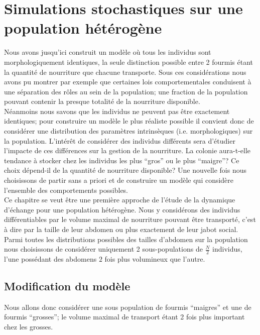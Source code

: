 
\chapter{Simulations stochastiques sur une population hétérogène}

Nous avons jusqu'ici construit un modèle où tous les individus sont morphologiquement identiques, la seule distinction possible entre 2 fourmis étant la quantité de nourriture que chacune transporte. Sous ces considérations nous avons pu montrer par exemple que certaines lois comportementales conduisent à une séparation des rôles au sein de la population; une fraction de la population pouvant contenir la presque totalité de la  nourriture disponible.\\

Néanmoins nous savons que les individus ne peuvent pas être exactement identiques; pour construire un modèle le plus réaliste possible il convient donc de considérer une distribution des paramètres intrinsèques (i.e. morphologiques) sur la population. L'intérêt de considérer des individus différents sera d'étudier l'impacte de ces différences sur la gestion de la nourriture. La colonie aura-t-elle tendance à stocker chez les individus les plus ``gros'' ou le plus ``maigre''? Ce choix dépend-il de la quantité de nourriture disponible? Une nouvelle fois nous choisissons de partir sans a priori et de construire un modèle qui considère l'ensemble des comportements possibles.\\

Ce chapitre se veut être une première approche de l'étude de la dynamique d'échange pour une population hétérogène. Nous y considérons des individus différentiables par le volume maximal de nourriture pouvant être transporté, c'est à dire par la taille de leur abdomen ou plus exactement de leur jabot social. Parmi toutes les distributions possibles des tailles d'abdomen sur la population nous choisissons de considérer uniquement   2 sous-populations de $\frac{N}{2}$ individus, l'une possédant des abdomens $2$ fois plus volumineux que l'autre.

\section{Modification du modèle}

Nous allons donc considérer une sous population de fourmis ``maigres'' et une de fourmis ``grosses''; le volume maximal de transport étant 2 fois plus important chez les grosses. \\

